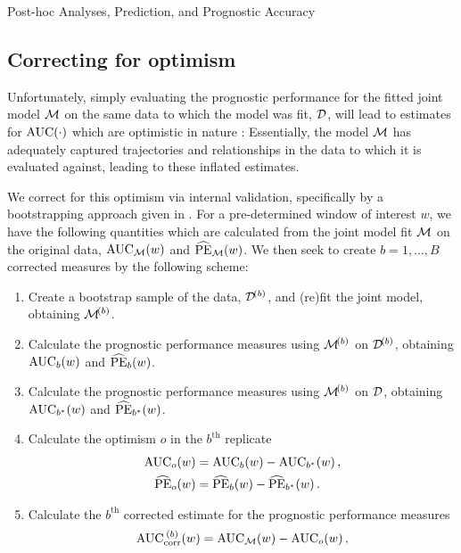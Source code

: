 \begin{chapter}{\label{cha:posthoc}Post-hoc Analyses, Prediction, and Prognostic Accuracy}
\subsection{Correcting for optimism}\label{sec:posthocs-prognostics-correction}
Unfortunately, simply evaluating the prognostic performance for the fitted joint model $\cal M$ on the same data to which the model was fit, $\cal D$, will lead to estimates for \eg $\mathrm{AUC}\!\left(\cdot\right)$ which are optimistic in nature \citep{Andrinopoulou2021, vanSmeden2021}: Essentially, the model $\cal M$ has adequately captured \eg trajectories and relationships in the data to which it is evaluated against, leading to these inflated estimates. 

We correct for this optimism via internal validation, specifically by a bootstrapping approach given in \citet{Andrinopoulou2021}. For a pre-determined window of interest $w$, we have the following quantities which are calculated from the joint model fit $\cal M$ on the original data, $\mathrm{AUC}_{\mathcal{M}}\!\left( w\right)$ and $\widehat{\mathrm{PE}}_{\mathcal{M}}\!\left( w\right)$. We then seek to create $b=1,\dots,B$ corrected measures by the following scheme:
\begin{enumerate}
    \item Create a bootstrap sample of the data, $\mathcal{D}^{\!\left( b\right)}$, and (re)fit the joint model, obtaining $\mathcal{M}^{\!\left( b\right)}$.
    \item Calculate the prognostic performance measures using $\mathcal{M}^{\!\left( b\right)}$ on $\mathcal{D}^{\!\left( b\right)}$, obtaining $\mathrm{AUC}_b\!\left( w\right)$ and $\widehat{\mathrm{PE}}_b\!\left( w\right)$. 
    \item Calculate the prognostic performance measures using $\mathcal{M}^{\!\left( b\right)}$ on $\cal D$, obtaining $\mathrm{AUC}_{b^*}\!\left( w\right)$ and $\widehat{\mathrm{PE}}_{b^*}\!\left( w\right)$.
    \item Calculate the optimism $o$ in the $b^{\mathrm{th}}$ replicate 
    \begin{align*}
        \mathrm{AUC}_{o}\!\left( w\right) &= \mathrm{AUC}_{b}\!\left( w\right)-\mathrm{AUC}_{b^*}\!\left( w\right),\\
        \widehat{\mathrm{PE}}_o\!\left( w\right) &= \widehat{\mathrm{PE}}_{b}\!\left( w\right)-\widehat{\mathrm{PE}}_{b^*}\!\left( w\right).
    \end{align*}
    \item Calculate the $b^{\mathrm{th}}$ corrected estimate for the prognostic performance measures
    \begin{align*}
        \mathrm{AUC}_{\mathrm{corr}}^{\ \lb b \rb}\lb w\rb = \mathrm{AUC}_{\mathcal{M}}\lb w\rb - \mathrm{AUC}_{o}\lb w\rb,\\

\end{align*}
\end{enumerate}
\end{chapter}
